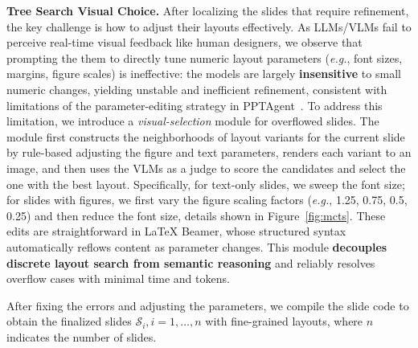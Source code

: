 \vspace{-1\baselineskip}
\noindent\textbf{Tree Search Visual Choice.} After localizing the slides that require refinement, the key challenge is how to adjust their layouts effectively. As LLMs/VLMs fail to perceive real-time visual feedback like human designers, we observe that prompting the them to directly tune numeric layout parameters (\textit{e.g.}, font sizes, margins, figure scales) is ineffective: the models are largely \textbf{insensitive} to small numeric changes, yielding unstable and inefficient refinement, consistent with limitations of the parameter-editing strategy in PPTAgent~\cite{zheng2025pptagent}. To address this limitation, we introduce a \emph{visual-selection} module for overflowed slides. The module first constructs the neighborhoods of layout variants for the current slide by rule-based adjusting the figure and text parameters, renders each variant to an image, and then uses the VLMs as a judge to score the candidates and select the one with the best layout. Specifically, for text-only slides, we sweep the font size; for slides with figures, we first vary the figure scaling factors (\textit{e.g.}, 1.25, 0.75, 0.5, 0.25) and then reduce the font size, details shown in Figure~\ref{fig:mcts}. These edits are straightforward in \LaTeX{} Beamer, whose structured syntax automatically reflows content as parameter changes. This module \textbf{decouples discrete layout search from semantic reasoning} and reliably resolves overflow cases with minimal time and tokens.

After fixing the errors and adjusting the parameters, we compile the slide code to obtain the finalized slides $\mathcal{S}_i,i=1,\dots,n$ with fine-grained layouts, where $n$ indicates the number of slides.




